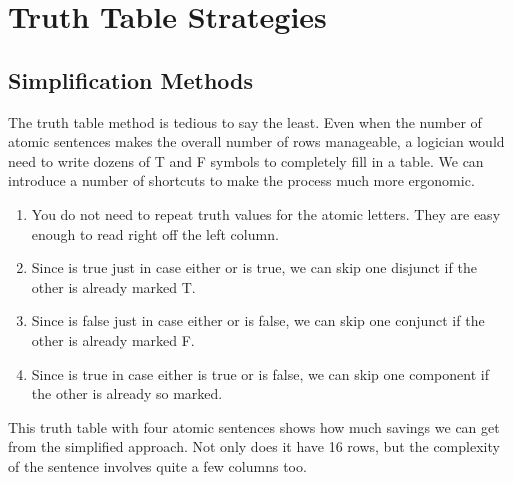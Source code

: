 \section{Truth Table Strategies}

\subsection{Simplification Methods}

The truth table method is tedious to say the least. Even when the number of
atomic sentences makes the overall number of rows manageable, a logician would
need to write dozens of T and F symbols to completely fill in a table. We can
introduce a number of shortcuts to make the process much more ergonomic.

\begin{observation}
  \label{obs:tt-simplified-methods}
  \begin{enumerate}
  \item You do not need to repeat truth values for the atomic letters. They are
    easy enough to read right off the left column.
  \item Since \ephi\eor\epsi is true just in case either \ephi or \epsi is true,
    we can skip one disjunct if the other is already marked T.
  \item Since \ephi\eand\epsi is false just in case either \ephi or \epsi is
    false, we can skip one conjunct if the other is already marked F.
  \item Since \ephi\eif\epsi is true in case either \epsi is true or \ephi is
    false, we can skip one component if the other is already so marked.
  \end{enumerate}
\end{observation}

This truth table with four atomic sentences shows how much savings we can get
from the simplified approach. Not only does it have 16 rows, but the complexity
of the sentence involves quite a few columns too. %

